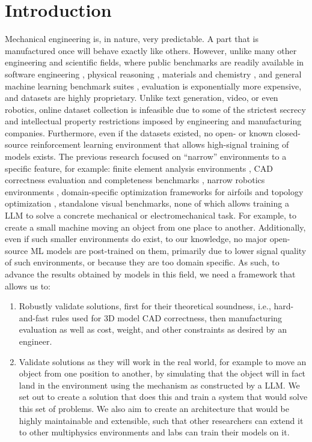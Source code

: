 \documentclass[conference]{IEEEtran}
\begin{document}
\section{Introduction}
Mechanical engineering is, in nature, very predictable. A part that is manufactured once will behave exactly like others. However, unlike many other engineering and scientific fields, where public benchmarks are readily available in software engineering \cite{ref17}, physical reasoning \cite{ref18}, materials and chemistry \cite{ref19}, and general machine learning benchmark suites \cite{ref20}, evaluation is exponentially more expensive, and datasets are highly proprietary. Unlike text generation, video, or even robotics, online dataset collection is infeasible due to some of the strictest secrecy and intellectual property restrictions imposed by engineering and manufacturing companies. Furthermore, even if the datasets existed, no open- or known closed-source reinforcement learning environment that allows high-signal training of models exists. The previous research focused on ``narrow'' environments to a specific feature, for example: finite element analysis environments \cite{ref27}, CAD correctness evaluation and completeness benchmarks \cite{ref21}, narrow robotics environments \cite{ref2}, domain-specific optimization frameworks for airfoils \cite{ref22} and topology optimization \cite{ref11}, standalone visual benchmarks, none of which allows training a LLM to solve a concrete mechanical or electromechanical task. For example, to create a small machine moving an object from one place to another. Additionally, even if such smaller environments do exist, to our knowledge, no major open-source ML models are post-trained on them, primarily due to lower signal quality of such environments, or because they are too domain specific. As such, to advance the results obtained by models in this field, we need a framework that allows us to:

\begin{enumerate}
    \item Robustly validate solutions, first for their theoretical soundness, i.e., hard-and-fast rules used for 3D model CAD correctness, then manufacturing evaluation as well as cost, weight, and other constraints as desired by an engineer.
    \item Validate solutions as they will work in the real world, for example to move an object from one position to another, by simulating that the object will in fact land in the environment using the mechanism as constructed by a LLM. We set out to create a solution that does this and train a system that would solve this set of problems. We also aim to create an architecture that would be highly maintainable and extensible, such that other researchers can extend it to other multiphysics environments and labs can train their models on it.
\end{enumerate}
\end{document}
